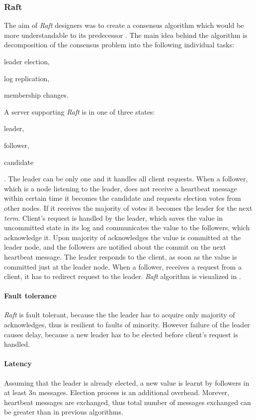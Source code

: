\subsubsection{Raft}
The aim of \emph{Raft} designers was to create a consensus algorithm which would be more understandable to its predecessor \cite{ongaro2014search}. 
The main idea behind the algorithm is decomposition of the consensus problem into the following individual tasks:
\begin{enumerate*}[label=\alph*)]
\item leader election,
\item log replication,
\item membership changes.
\end{enumerate*} 
 
 A server supporting \emph{Raft} is in one of three states: \begin{enumerate*}[label=\alph*)] \item leader, \item follower, \item candidate \end{enumerate*}. The leader can be only one and it handles all client requests.
  When a follower, which is a node listening to the leader, does not receive a heartbeat message within certain time it becomes the candidate and requests election votes from other nodes. If it receives the majority of votes it becomes the leader for the next \emph{term}. Client's request is handled by the leader, which saves the value in uncommitted state in its log and communicates the value to the followers, which acknowledge it. Upon majority of acknowledges the value is committed at the leader node, and the followers are notified about the commit on the next heartbeat message. The leader responds to the client, as soon as the value is committed just at the leader node. When a follower, receives a request from a client, it has to redirect request to the leader. \emph{Raft} algorithm is visualized in \cite{raftVisual}.

\paragraph{Fault tolerance} \emph{Raft} is fault tolerant, because the the leader has to acquire only majority of acknowledges, thus is resilient to faults of minority. However failure of the leader causes delay, because a new leader has to be elected before client's request is handled.

\paragraph{Latency} Assuming that the leader is already elected, a new value is learnt by followers in at least $3n$ messages. Election process is an additional overhead. Morever, heartbeat messages are exchanged, thus total number of messages exchanged can be greater than in previous algorithms.

